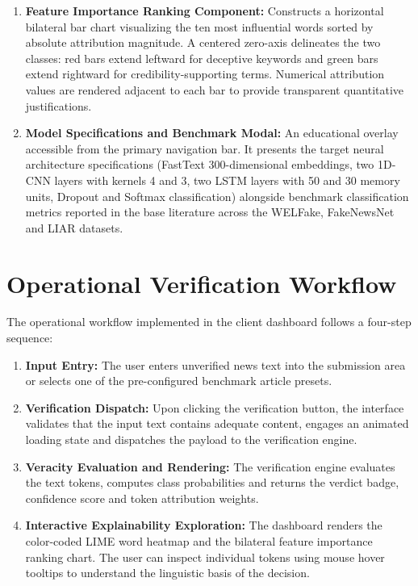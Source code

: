 \documentclass[12pt,a4paper,oneside]{report}
\begin{document}
\begin{enumerate}[label=\arabic*., leftmargin=*, itemsep=4pt]
  \item \textbf{Feature Importance Ranking Component:}
        Constructs a horizontal bilateral bar chart visualizing the ten most influential
        words sorted by absolute attribution magnitude. A centered zero-axis delineates the
        two classes: red bars extend leftward for deceptive keywords and green bars extend
        rightward for credibility-supporting terms. Numerical attribution values are rendered
        adjacent to each bar to provide transparent quantitative justifications.

  \item \textbf{Model Specifications and Benchmark Modal:}
        An educational overlay accessible from the primary navigation bar. It presents the
        target neural architecture specifications (FastText 300-dimensional embeddings, two
        1D-CNN layers with kernels 4 and 3, two LSTM layers with 50 and 30 memory units,
        Dropout and Softmax classification) alongside benchmark classification metrics
        reported in the base literature across the WELFake, FakeNewsNet and LIAR datasets.
\end{enumerate}

\section{Operational Verification Workflow}

The operational workflow implemented in the client dashboard follows a four-step
sequence:

\begin{enumerate}[label=\arabic*., leftmargin=*, itemsep=2pt]
  \item \textbf{Input Entry:} The user enters unverified news text into the submission
        area or selects one of the pre-configured benchmark article presets.
  \item \textbf{Verification Dispatch:} Upon clicking the verification button, the
        interface validates that the input text contains adequate content, engages an
        animated loading state and dispatches the payload to the verification engine.
  \item \textbf{Veracity Evaluation and Rendering:} The verification engine evaluates
        the text tokens, computes class probabilities and returns the verdict badge,
        confidence score and token attribution weights.
  \item \textbf{Interactive Explainability Exploration:} The dashboard renders the
        color-coded LIME word heatmap and the bilateral feature importance ranking chart.
        The user can inspect individual tokens using mouse hover tooltips to understand the
        linguistic basis of the decision.
\end{enumerate}
\end{document}

